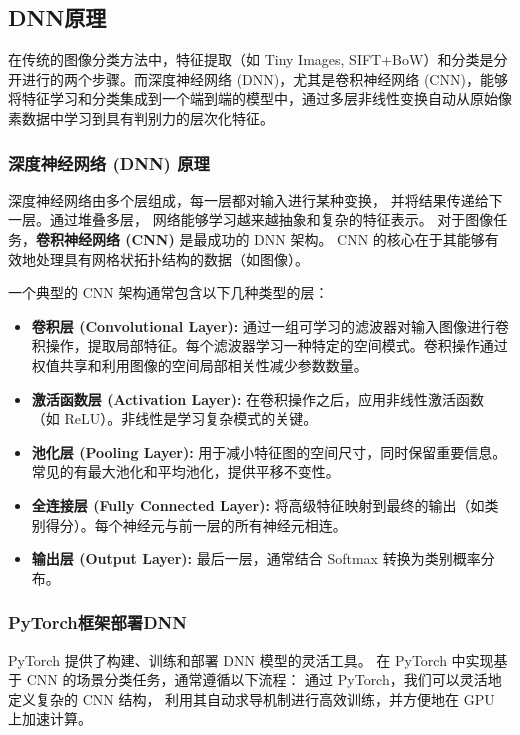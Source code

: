 \subsection{DNN原理}

在传统的图像分类方法中，特征提取（如 Tiny Images, SIFT+BoW）和分类是分开进行的两个步骤。而深度神经网络 (DNN)，尤其是卷积神经网络 (CNN)，能够将特征学习和分类集成到一个端到端的模型中，通过多层非线性变换自动从原始像素数据中学习到具有判别力的层次化特征。

\subsubsection{深度神经网络 (DNN) 原理}

深度神经网络由多个层组成，每一层都对输入进行某种变换，
并将结果传递给下一层。通过堆叠多层，
网络能够学习越来越抽象和复杂的特征表示。
对于图像任务，\textbf{卷积神经网络 (CNN)} 是最成功的 DNN 架构。
CNN 的核心在于其能够有效地处理具有网格状拓扑结构的数据（如图像）。

一个典型的 CNN 架构通常包含以下几种类型的层：

\begin{itemize}
    \item \textbf{卷积层 (Convolutional Layer):} 通过一组可学习的滤波器对输入图像进行卷积操作，提取局部特征。每个滤波器学习一种特定的空间模式。卷积操作通过权值共享和利用图像的空间局部相关性减少参数数量。
    \item \textbf{激活函数层 (Activation Layer):} 在卷积操作之后，应用非线性激活函数（如 ReLU）。非线性是学习复杂模式的关键。
    \item \textbf{池化层 (Pooling Layer):} 用于减小特征图的空间尺寸，同时保留重要信息。常见的有最大池化和平均池化，提供平移不变性。
    \item \textbf{全连接层 (Fully Connected Layer):} 将高级特征映射到最终的输出（如类别得分）。每个神经元与前一层的所有神经元相连。
    \item \textbf{输出层 (Output Layer):} 最后一层，通常结合 Softmax 转换为类别概率分布。
\end{itemize}

\subsubsection{PyTorch框架部署DNN}

PyTorch 提供了构建、训练和部署 DNN 模型的灵活工具。
在 PyTorch 中实现基于 CNN 的场景分类任务，通常遵循以下流程：
通过 PyTorch，我们可以灵活地定义复杂的 CNN 结构，
利用其自动求导机制进行高效训练，并方便地在 GPU 上加速计算。
